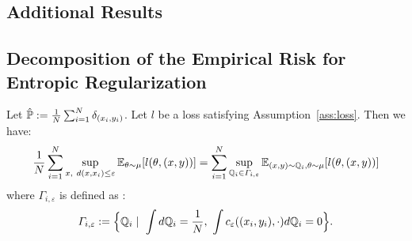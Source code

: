 \subsection{Additional Results}
\label{sec:complements}

\subsection{Decomposition of the Empirical Risk for Entropic Regularization}

\begin{prop}
Let $\hat{\mathbb{P}}:=\frac1N\sum_{i=1}^N \delta_{(x_i,y_i)}$. Let $l$ be a loss satisfying Assumption~\ref{ass:loss}. Then we have:
\begin{align*}
\frac{1}{N}\sum_{i=1}^N\sup_{x,~d(x,x_i)\leq\varepsilon}\mathbb{E}_{\theta \sim \mu}\left[l(\theta,(x,y))\right]=\sum_{i=1}^N\sup_{\QQ_i\in\Gamma_{i,\varepsilon}}\mathbb{E}_{(x,y)\sim \QQ_i,\theta \sim \mu}\left[l(\theta,(x,y))\right]
\end{align*}
where $\Gamma_{i,\varepsilon}$ is defined as : 
\begin{align*}
    \Gamma_{i,\varepsilon}:=\Big\{\mathbb{Q}_i\mid~\int d\mathbb{Q}_i=\frac{1}{N},~\int c_{\varepsilon}((x_i,y_i),\cdot) d\mathbb{Q}_i=0\Big\}.
\end{align*}\end{prop}

